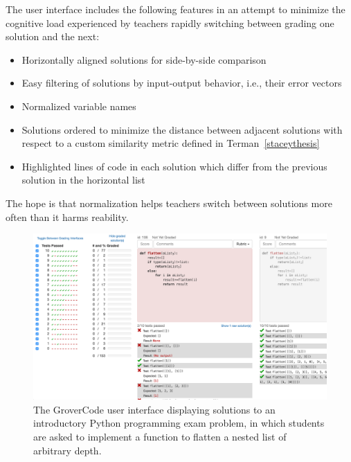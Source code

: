 The user interface includes the following features in an attempt to minimize the cognitive load experienced by teachers rapidly switching between grading one solution and the next:
\begin{itemize}
\item Horizontally aligned solutions for side-by-side comparison
\item Easy filtering of solutions by input-output behavior, i.e., their error vectors
\item Normalized variable names
\item Solutions ordered to minimize the distance between adjacent solutions with respect to a custom similarity metric defined in Terman~\ref{staceythesis}
\item Highlighted lines of code in each solution which differ from the previous solution in the horizontal list
\end{itemize}

The hope is that normalization helps teachers switch between solutions more often than it harms reability.

\begin{figure}
\centering
\includegraphics[width=\textwidth]{Body/figures/grovercode/figure_1}
\caption{The GroverCode user interface displaying solutions to an introductory Python programming exam problem, in which students are asked to implement a function to flatten a nested list of arbitrary depth.
}
\label{fig:whole_interface}
\end{figure} 


